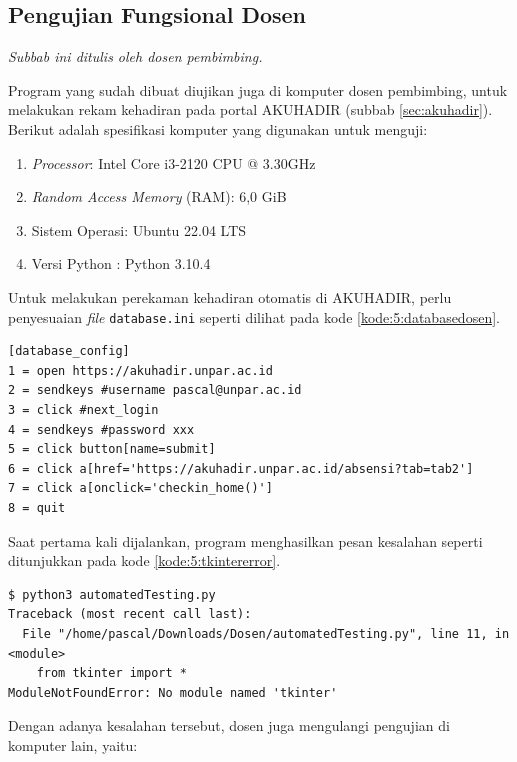 \subsection{Pengujian Fungsional Dosen}

\textit{Subbab ini ditulis oleh dosen pembimbing.}

Program yang sudah dibuat diujikan juga di komputer dosen pembimbing, untuk melakukan rekam kehadiran pada portal AKUHADIR (subbab \ref{sec:akuhadir}). Berikut adalah spesifikasi komputer yang digunakan untuk menguji:

\begin{enumerate}
	\item \textit{Processor}: Intel Core i3-2120 CPU @ 3.30GHz 
	\item \textit{Random Access Memory} (RAM): 6,0 GiB
	\item Sistem Operasi: Ubuntu 22.04 LTS
	\item Versi Python : Python 3.10.4
\end{enumerate}

Untuk melakukan perekaman kehadiran otomatis di AKUHADIR, perlu penyesuaian \textit{file} \texttt{database.ini} seperti dilihat pada kode \ref{kode:5:databasedosen}.

\begin{lstlisting}[caption=\textit{File} \texttt{database.ini} AKUHADIR (\textit{password} disembunyikan), label=kode:5:databasedosen]
[database_config]
1 = open https://akuhadir.unpar.ac.id
2 = sendkeys #username pascal@unpar.ac.id
3 = click #next_login
4 = sendkeys #password xxx
5 = click button[name=submit]
6 = click a[href='https://akuhadir.unpar.ac.id/absensi?tab=tab2']
7 = click a[onclick='checkin_home()']
8 = quit
\end{lstlisting}

Saat pertama kali dijalankan, program menghasilkan pesan kesalahan seperti ditunjukkan pada kode \ref{kode:5:tkintererror}.

\begin{lstlisting}[caption=Pesan kesalahan skrip tanpa \textit{tkinter}, label=kode:5:tkintererror]
$ python3 automatedTesting.py 
Traceback (most recent call last):
  File "/home/pascal/Downloads/Dosen/automatedTesting.py", line 11, in <module>
    from tkinter import * 
ModuleNotFoundError: No module named 'tkinter'
\end{lstlisting}

Dengan adanya kesalahan tersebut, dosen juga mengulangi pengujian di komputer lain, yaitu:


